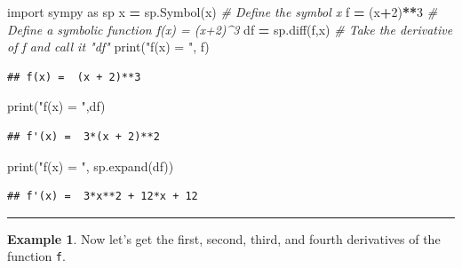 \documentclass[
]{book}
\newenvironment{Shaded}{\begin{snugshade}}{\end{snugshade}}
\newcommand{\BuiltInTok}[1]{#1}
\newcommand{\CommentTok}[1]{\textcolor[rgb]{0.56,0.35,0.01}{\textit{#1}}}
\newcommand{\DecValTok}[1]{\textcolor[rgb]{0.00,0.00,0.81}{#1}}
\newcommand{\ImportTok}[1]{#1}
\newcommand{\NormalTok}[1]{#1}
\newcommand{\OperatorTok}[1]{\textcolor[rgb]{0.81,0.36,0.00}{\textbf{#1}}}
\newcommand{\StringTok}[1]{\textcolor[rgb]{0.31,0.60,0.02}{#1}}
\theoremstyle{definition}
\theoremstyle{definition}
\newtheorem{example}{Example}[chapter]
\theoremstyle{definition}
\theoremstyle{remark}
\begin{document}
\begin{Shaded}
\begin{Highlighting}[]
\ImportTok{import}\NormalTok{ sympy }\ImportTok{as}\NormalTok{ sp }
\NormalTok{x }\OperatorTok{=}\NormalTok{ sp.Symbol(}\StringTok{\textquotesingle{}x\textquotesingle{}}\NormalTok{) }\CommentTok{\# Define the symbol x}
\NormalTok{f }\OperatorTok{=}\NormalTok{ (x}\OperatorTok{+}\DecValTok{2}\NormalTok{)}\OperatorTok{**}\DecValTok{3} \CommentTok{\# Define a symbolic function f(x) = (x+2)\^{}3}
\NormalTok{df }\OperatorTok{=}\NormalTok{ sp.diff(f,x) }\CommentTok{\# Take the derivative of f and call it "df"}
\BuiltInTok{print}\NormalTok{(}\StringTok{"f(x) = "}\NormalTok{, f)}
\end{Highlighting}
\end{Shaded}

\begin{verbatim}
## f(x) =  (x + 2)**3
\end{verbatim}

\begin{Shaded}
\begin{Highlighting}[]
\BuiltInTok{print}\NormalTok{(}\StringTok{"f\textquotesingle{}(x) = "}\NormalTok{,df)}
\end{Highlighting}
\end{Shaded}

\begin{verbatim}
## f'(x) =  3*(x + 2)**2
\end{verbatim}

\begin{Shaded}
\begin{Highlighting}[]
\BuiltInTok{print}\NormalTok{(}\StringTok{"f\textquotesingle{}(x) = "}\NormalTok{, sp.expand(df))}
\end{Highlighting}
\end{Shaded}

\begin{verbatim}
## f'(x) =  3*x**2 + 12*x + 12
\end{verbatim}

\begin{center}\rule{0.5\linewidth}{0.5pt}\end{center}

\begin{example}
\protect\hypertarget{exm:unnamed-chunk-796}{}{\label{exm:unnamed-chunk-796} }Now let's get the first, second, third, and fourth derivatives of the
function \texttt{f}.
\end{example}
\end{document}
